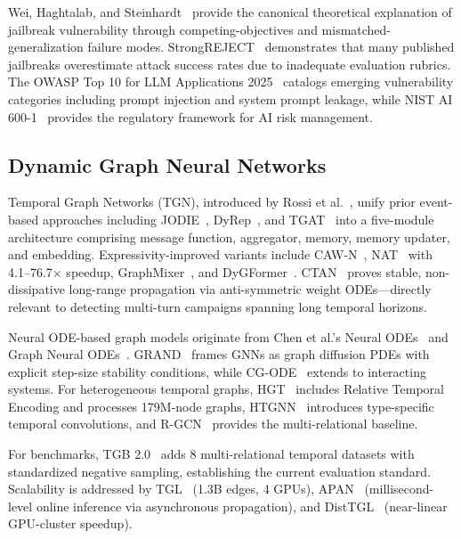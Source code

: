 \documentclass[journal]{IEEEtran}
\theoremstyle{plain}
\theoremstyle{definition}
\theoremstyle{remark}
\begin{document}
Wei, Haghtalab, and Steinhardt~\cite{wei2023jailbroken} provide the canonical theoretical explanation of jailbreak vulnerability through competing-objectives and mismatched-generalization failure modes. StrongREJECT~\cite{souly2024strongreject} demonstrates that many published jailbreaks overestimate attack success rates due to inadequate evaluation rubrics. The OWASP Top 10 for LLM Applications 2025~\cite{owasp2025llm} catalogs emerging vulnerability categories including prompt injection and system prompt leakage, while NIST AI 600-1~\cite{nist2024ai600} provides the regulatory framework for AI risk management.

\subsection{Dynamic Graph Neural Networks}

Temporal Graph Networks (TGN), introduced by Rossi et al.~\cite{rossi2020tgn}, unify prior event-based approaches including JODIE~\cite{kumar2019jodie}, DyRep~\cite{trivedi2019dyrep}, and TGAT~\cite{xu2020tgat} into a five-module architecture comprising message function, aggregator, memory, memory updater, and embedding. Expressivity-improved variants include CAW-N~\cite{wang2021cawn}, NAT~\cite{luo2022nat} with 4.1--76.7$\times$ speedup, GraphMixer~\cite{cong2023graphmixer}, and DyGFormer~\cite{yu2023dygformer}. CTAN~\cite{gravina2024ctan} proves stable, non-dissipative long-range propagation via anti-symmetric weight ODEs---directly relevant to detecting multi-turn campaigns spanning long temporal horizons.

Neural ODE-based graph models originate from Chen et al.'s Neural ODEs~\cite{chen2018neuralode} and Graph Neural ODEs~\cite{poli2019graphode}. GRAND~\cite{chamberlain2021grand} frames GNNs as graph diffusion PDEs with explicit step-size stability conditions, while CG-ODE~\cite{huang2021cgode} extends to interacting systems. For heterogeneous temporal graphs, HGT~\cite{hu2020hgt} includes Relative Temporal Encoding and processes 179M-node graphs, HTGNN~\cite{fan2022htgnn} introduces type-specific temporal convolutions, and R-GCN~\cite{schlichtkrull2018rgcn} provides the multi-relational baseline.

For benchmarks, TGB 2.0~\cite{gastinger2024tgb2} adds 8 multi-relational temporal datasets with standardized negative sampling, establishing the current evaluation standard. Scalability is addressed by TGL~\cite{zhou2022tgl} (1.3B edges, 4 GPUs), APAN~\cite{wang2021apan} (millisecond-level online inference via asynchronous propagation), and DistTGL~\cite{zhou2023disttgl} (near-linear GPU-cluster speedup).
\end{document}
